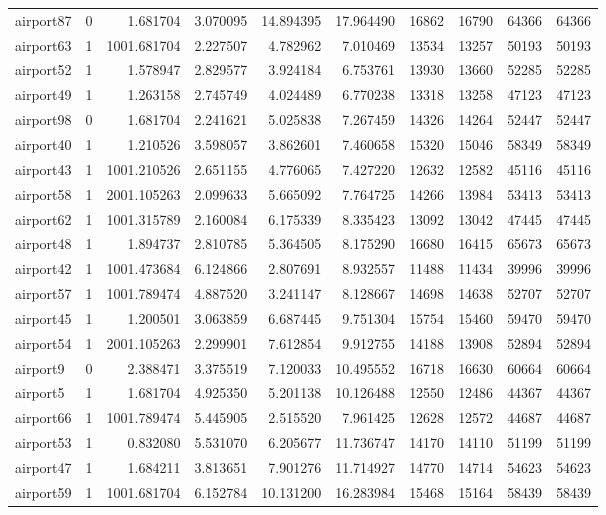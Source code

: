 \begin{longtable}{|l|r|r|r|r|r|r|r|r|r|}
airport87 & 0 & 1.681704 & 3.070095 & 14.894395 & 17.964490 & 16862 & 16790 & 64366 & 64366 \\
airport63 & 1 & 1001.681704 & 2.227507 & 4.782962 & 7.010469 & 13534 & 13257 & 50193 & 50193 \\
airport52 & 1 & 1.578947 & 2.829577 & 3.924184 & 6.753761 & 13930 & 13660 & 52285 & 52285 \\
airport49 & 1 & 1.263158 & 2.745749 & 4.024489 & 6.770238 & 13318 & 13258 & 47123 & 47123 \\
airport98 & 0 & 1.681704 & 2.241621 & 5.025838 & 7.267459 & 14326 & 14264 & 52447 & 52447 \\
airport40 & 1 & 1.210526 & 3.598057 & 3.862601 & 7.460658 & 15320 & 15046 & 58349 & 58349 \\
airport43 & 1 & 1001.210526 & 2.651155 & 4.776065 & 7.427220 & 12632 & 12582 & 45116 & 45116 \\
airport58 & 1 & 2001.105263 & 2.099633 & 5.665092 & 7.764725 & 14266 & 13984 & 53413 & 53413 \\
airport62 & 1 & 1001.315789 & 2.160084 & 6.175339 & 8.335423 & 13092 & 13042 & 47445 & 47445 \\
airport48 & 1 & 1.894737 & 2.810785 & 5.364505 & 8.175290 & 16680 & 16415 & 65673 & 65673 \\
airport42 & 1 & 1001.473684 & 6.124866 & 2.807691 & 8.932557 & 11488 & 11434 & 39996 & 39996 \\
airport57 & 1 & 1001.789474 & 4.887520 & 3.241147 & 8.128667 & 14698 & 14638 & 52707 & 52707 \\
airport45 & 1 & 1.200501 & 3.063859 & 6.687445 & 9.751304 & 15754 & 15460 & 59470 & 59470 \\
airport54 & 1 & 2001.105263 & 2.299901 & 7.612854 & 9.912755 & 14188 & 13908 & 52894 & 52894 \\
airport9 & 0 & 2.388471 & 3.375519 & 7.120033 & 10.495552 & 16718 & 16630 & 60664 & 60664 \\
airport5 & 1 & 1.681704 & 4.925350 & 5.201138 & 10.126488 & 12550 & 12486 & 44367 & 44367 \\
airport66 & 1 & 1001.789474 & 5.445905 & 2.515520 & 7.961425 & 12628 & 12572 & 44687 & 44687 \\
airport53 & 1 & 0.832080 & 5.531070 & 6.205677 & 11.736747 & 14170 & 14110 & 51199 & 51199 \\
airport47 & 1 & 1.684211 & 3.813651 & 7.901276 & 11.714927 & 14770 & 14714 & 54623 & 54623 \\
airport59 & 1 & 1001.681704 & 6.152784 & 10.131200 & 16.283984 & 15468 & 15164 & 58439 & 58439 \\

\end{longtable}
